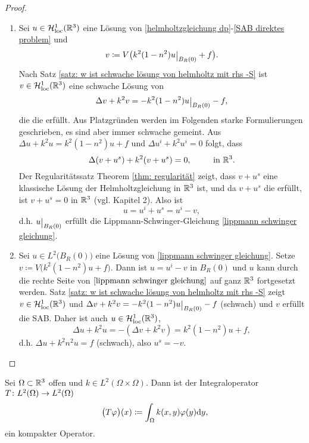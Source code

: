 \begin{proof}\
	\begin{enumerate}[label=(\alph*)]
		\item Sei \(u\in\mathcal{H}_{\mathrm{loc}}^1(\mathbb{R}^3)\) eine Lösung von \eqref{helmholtzgleichung dp}-\eqref{SAB direktes problem} und
		\begin{equation*}
			v\coloneqq V\big(k^2(1-n^2)u\restrict{B_R(0)}+f\big).
		\end{equation*}
		Nach Satz \ref{satz: w ist schwache lösung von helmholtz mit rhs -S} ist \(v\in\mathcal{H}_{\mathrm{loc}}^1(\mathbb{R}^3)\) eine schwache Lösung von
		\begin{equation*}
			\Delta v+k^2v=-k^2(1-n^2)u\restrict{B_R(0)}-f,
		\end{equation*}
		die die \SABdp erfüllt. Aus Platzgründen werden im Folgenden starke Formulierungen geschrieben, es sind aber immer schwache gemeint. Aus \(\Delta u+k^2u=k^2(1-n^2)u+f\) und \(\Delta u^i+k^2u^i=0\) folgt, dass
		\begin{equation*}
			\Delta(v+u^s)+k^2(v+u^s)=0,\;\qquad\text{ in }\mathbb{R}^3.
		\end{equation*}
		Der Regularitätssatz Theorem \ref{thm: regularität} zeigt, dass \(v+u^s\) eine klassische Lösung der Helmholtzgleichung in \(\mathbb{R}^3\) ist, und da \(v+u^s\) die \SABdp erfüllt, ist \(v+u^s=0\) in \(\mathbb{R}^3\) (vgl. Kapitel 2). Also ist
		\begin{equation*}
			u=u^i+u^s=u^i-v,
		\end{equation*}
		d.h. \(u\restrict{B_R(0)}\) erfüllt die Lippmann-Schwinger-Gleichung \eqref{lippmann schwinger gleichung}.
		\item Sei \(u\in L^2\big(B_R(0)\big)\) eine Lösung von \eqref{lippmann schwinger gleichung}. Setze \(v\coloneqq V\big(k^2(1-n^2)u+f\big)\). Dann ist \(u=u^i-v\) in \(B_R(0)\) und \(u\) kann durch die rechte Seite von \(\eqref{lippmann schwinger gleichung}\) auf ganz \(\mathbb{R}^3\) fortgesetzt werden. Satz \ref{satz: w ist schwache lösung von helmholtz mit rhs -S} zeigt \(v\in\mathcal{H}_{\mathrm{loc}}^1(\mathbb{R}^3)\) und \(\Delta v+k^2v=-k^2(1-n^2)u\restrict{B_R(0)}-f\) (schwach) und \(v\) erfüllt die SAB. Daher ist auch \(u\in\mathcal{H}_{\mathrm{loc}}^1(\mathbb{R}^3)\),
		\begin{equation*}
			\Delta u+k^2u=-(\Delta v+k^2v)=k^2(1-n^2)u+f,
		\end{equation*}
		d.h. \(\Delta u+k^2n^2u=f\) (schwach), also \(u^s=-v\).
	\end{enumerate}
\end{proof}
\begin{lem}\label{lem: kompakter integraloperator}
	Sei \(\Omega\subset\mathbb{R}^3\) offen und \(k\in L^2(\Omega\times\Omega)\). Dann ist der Integraloperator \(T\colon L^2(\Omega) \to L^2(\Omega)\)
	\begin{equation*}
		\big(T\varphi\big)(x)\coloneqq\int_\Omega k(x,y)\varphi(y)\mathrm{d}y,
	\end{equation*}
	ein kompakter Operator.
\end{lem}
